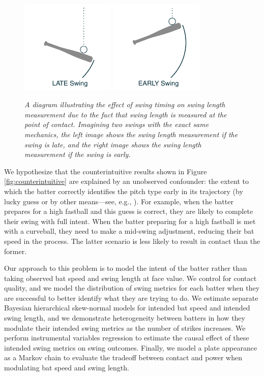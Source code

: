 \documentclass[
  12pt]{article}
\begin{document}
    \begin{figure}
      \centering
      \includegraphics[width = 0.4\textwidth]{../../figures/swing_late.pdf}
      \includegraphics[width = 0.4\textwidth]{../../figures/swing_early.pdf}
      \caption{\it A diagram illustrating the effect of swing timing on swing length measurement due to the fact that swing length is measured at the point of contact. Imagining two swings with the exact same mechanics, the left image shows the swing length measurement if the swing is late, and the right image shows the swing length measurement if the swing is early.}
      \label{fig:swing-diagram}
    \end{figure}

    We hypothesize that the counterintuitive results shown in Figure \ref{fig:counterintuitive} are explained by an unobserved confounder: the extent to which the batter correctly identifies the pitch type early in its trajectory (by lucky guess or by other means---see, e.g., \citet{elmore_bang_2022}). For example, when the batter prepares for a high fastball and this guess is correct, they are likely to complete their swing with full intent. When the batter preparing for a high fastball is met with a curveball, they need to make a mid-swing adjustment, reducing their bat speed in the process. The latter scenario is less likely to result in contact than the former.

    Our approach to this problem is to model the intent of the batter rather than taking observed bat speed and swing length at face value. We control for contact quality, and we model the distribution of swing metrics for each batter when they are successful to better identify what they are trying to do. We estimate separate Bayesian hierarchical skew-normal models for intended bat speed and intended swing length, and we demonstrate heterogeneity between batters in how they modulate their intended swing metrics as the number of strikes increases. We perform instrumental variables regression to estimate the causal effect of these intended swing metrics on swing outcomes. Finally, we model a plate appearance as a Markov chain to evaluate the tradeoff between contact and power when modulating bat speed and swing length.
\end{document}
